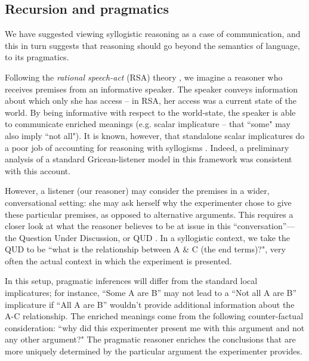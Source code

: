 \documentclass[10pt,letterpaper]{article}
\begin{document}
\subsection{Recursion and pragmatics}
We have suggested viewing syllogistic reasoning as a case of communication, and this in turn suggests that reasoning should go beyond the semantics of language, to its pragmatics.


Following the \emph{rational speech-act} (RSA) theory \cite{Goodman2013,Frank2012a}, we imagine a reasoner who receives premises from an informative speaker. The speaker conveys information about which only she has access -- in RSA, her access was a current state of the world. By being informative with respect to the world-state, the speaker is able to communicate enriched meanings (e.g. scalar implicature -- that ``some" may also imply ``not all"). It is known, however, that standalone scalar implicatures do a poor job of accounting for reasoning with syllogisms \cite{Roberts2001}. Indeed, a preliminary analysis of a standard Gricean-listener model in this framework was consistent with this account. 

However, a listener (our reasoner) may consider the premises in a wider, conversational setting: she may ask herself why the experimenter chose to give these particular premises, as opposed to alternative arguments. This requires a closer look at what the reasoner believes to be at issue in this ``conversation''---the Question Under Discussion, or QUD \cite{Roberts2004QUD}. In a syllogistic context, we take the QUD to be ``what is the relationship between A \& C (the end terms)?", very often the actual context in which the experiment is presented. 

In this setup, pragmatic inferences will differ from the standard local implicatures; for instance, ``Some A are B'' may not lead to a ``Not all A are B'' implicature if ``All A are B'' wouldn't provide additional information about the A-C relationship. The enriched meanings come from the following counter-factual consideration: ``why did this experimenter present me with this argument and not any other argument?" The pragmatic reasoner enriches the conclusions that are more uniquely determined by the particular argument the experimenter provides.
\end{document}
